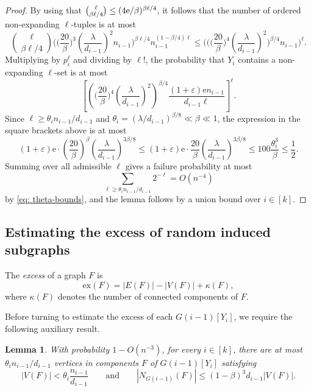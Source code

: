 \documentclass[reqno,a4paper]{amsart}
\newtheorem{lemma}[theorem]{Lemma}
\theoremstyle{definition}
\newcommand{\eps}{\varepsilon}
\newcommand{\e}{\mathrm{e}}
\newcommand{\ex}{\mathrm{ex}}
\begin{document}
\begin{proof}
By using that $\tbinom{\ell}{\beta\ell/4}\le (4\e/\beta)^{\beta\ell/4}$, it follows that the number of ordered non-expanding $\ell$-tuples is at most
\[
    \binom{\ell}{\beta\ell/4}
    \bigg(\bigg(\frac{20}{\beta}\bigg)^3\left(\frac{\lambda}{d_{i-1}}\right)^2n_{i-1}\bigg)^{\beta\ell/4}
    n_{i-1}^{(1-\beta/4)\ell}
    \le
    \bigg(\bigg(\bigg(\frac{20}{\beta}\bigg)^4\left(\frac{\lambda}{d_{i-1}}\right)^2\bigg)^{\beta/4}n_{i-1}\bigg)^\ell.
\]
Multiplying by $p_i^{\ell}$
and dividing by $\ell!$, the probability that $Y_i$ contains a non-expanding $\ell$-set is at most
\[
    \left[
    \left(\bigg(\frac{20}{\beta}\bigg)^4\left(\frac{\lambda}{d_{i-1}}\right)^2\right)^{\beta/4}
    \frac{(1+\eps)\e n_{i-1}}{d_{i-1}\ell}
    \right]^\ell.
\]
Since $\ell\ge\theta_i n_{i-1}/d_{i-1}$ and $\theta_i=(\lambda/d_{i-1})^{\beta/8}\ll \beta\ll 1$, the expression in the square brackets above is at most
\[
    (1+\eps)\e\cdot \left(\frac{20}{\beta}\right)^\beta \left(\frac{\lambda}{d_{i-1}}\right)^{3\beta/8}\le (1+\eps)\e\cdot \frac{20}{\beta} \left(\frac{\lambda}{d_{i-1}}\right)^{3\beta/8}\le 100 \frac{\theta_i^3}{\beta}\le \frac{1}{2}.
\]
Summing over all admissible $\ell$ gives a failure probability at most
\[
    \sum_{\ell\ge \theta_i n_{i-1}/d_{i-1}}2^{-\ell}=O(n^{-4})
\]
by \eqref{eq: theta-bounds}, and the lemma follows by a union bound over $i\in [k]$.
\end{proof}

\subsection{Estimating the excess of random induced subgraphs}\label{s: excess}
The \emph{excess} of a graph $F$ is
\[
    \ex(F)=|E(F)|-|V(F)|+\kappa(F),
\]
where $\kappa(F)$ denotes the number of connected components of $F$. 

Before turning to estimate the excess of each $G(i-1)[Y_i]$, we require the following auxiliary result.

\begin{lemma}\label{l: small non-expand}
With probability $1-O(n^{-3})$, for every $i\in[k]$, there are at most $\theta_in_{i-1}/d_{i-1}$ vertices in components $F$ of $G(i-1)[Y_i]$ satisfying
\[
    |V(F)|<\theta_i\frac{n_{i-1}}{d_{i-1}}
    \qquad\text{and}\qquad
    |N_{G(i-1)}(F)|\le (1-\beta)^3d_{i-1}|V(F)|.
\]
\end{lemma}
\end{document}

